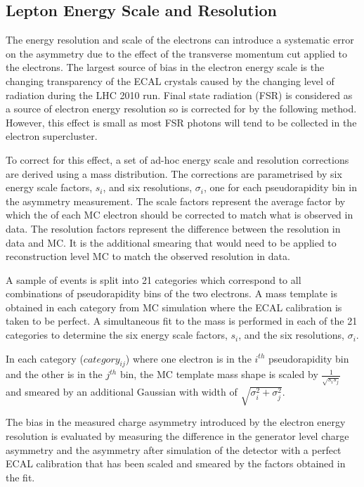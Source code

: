 \subsection{Lepton Energy Scale and Resolution}
\label{sec:adhoc}

The energy resolution and scale of the electrons can introduce a systematic
error on the asymmetry due to the effect of the transverse momentum cut applied
to the electrons. The largest source of bias in the electron energy scale is the
changing transparency of the ECAL crystals caused by the changing level of
radiation during the {LHC} 2010 run. Final state radiation (FSR) is considered
as a source of electron energy resolution so is corrected for by the following
method. However, this effect is small as most FSR photons will tend to be
collected in the electron supercluster.

To correct for this effect, a set of ad-hoc energy scale and resolution corrections are
derived using a \Zee mass distribution. The corrections are parametrised by
six energy scale factors, $s_i$, and six resolutions, $\sigma_i$, one for each
pseudorapidity bin in the asymmetry measurement.
The scale factors represent the average factor by which the \pT of each {MC} electron
should be corrected to match what is observed in data.
The resolution factors represent the difference between the resolution in data and
{MC}. It is the additional smearing that would need to be applied to
reconstruction level {MC} to match the observed resolution in data.

A sample of \Zee events is  split into 21 categories which correspond to all
combinations of pseudorapidity bins of the two electrons.  A mass template is
obtained in each category from {MC} simulation where the {ECAL} calibration is
taken to be perfect.
A simultaneous fit to the \Zee mass is performed in each of the 21 categories
to determine the six energy scale factors, $s_i$, and the six resolutions, 
$\sigma_i$.

In each category ($category_{ij}$) where one electron is in the $i^{th}$
pseudorapidity bin and the other is in the $j^{th}$ bin, the {MC} template
mass shape is scaled by $\frac{1}{\sqrt{s_i s_j} } $
and smeared by an additional Gaussian with width of
$\sqrt{\sigma_i^2+\sigma_j^2}$.

The bias in the measured charge asymmetry introduced by the
electron energy resolution is evaluated by measuring the difference in the
generator level charge asymmetry and the asymmetry after simulation of the
detector with a perfect ECAL calibration that has been scaled and smeared by the
factors obtained in the fit.

